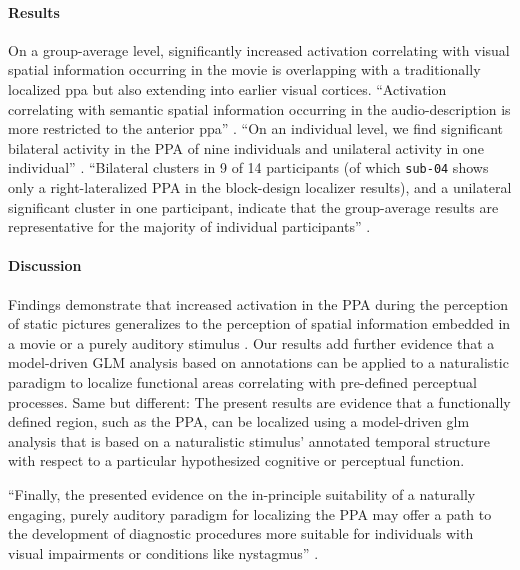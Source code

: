 \paragraph{Results}

On a group-average level, significantly increased activation correlating with
visual spatial information occurring in the movie is overlapping with a
traditionally localized \ac{ppa} but also extending into earlier visual
cortices.
``Activation correlating with semantic spatial information occurring in the
audio-description is more restricted to the anterior \ac{ppa}''
\citep{haeusler2022processing}.
``On an individual level, we find significant bilateral activity in the PPA of
nine individuals and unilateral activity in one individual''
\citep{haeusler2022processing}.
``Bilateral clusters in 9 of 14 participants (of which \texttt{sub-04} shows
only a right-lateralized PPA in the block-design localizer results), and a
unilateral significant cluster in one participant, indicate that the
group-average results are representative for the majority of individual
participants'' \citep{haeusler2022processing}.


\paragraph{Discussion}

Findings demonstrate that increased activation in the PPA during the perception
of static pictures generalizes to the perception of spatial information embedded
in a movie or a purely auditory stimulus \citep{haeusler2022processing}.
Our results add further evidence that a model-driven GLM analysis based on
annotations can be applied to a naturalistic paradigm to localize functional
areas correlating with pre-defined perceptual processes.
%
Same but different: The present results are evidence that a functionally defined
region, such as the PPA, can be localized using a model-driven \ac{glm} analysis
that is based on a naturalistic stimulus' annotated temporal structure with
respect to a particular hypothesized cognitive or perceptual function.

``Finally, the presented evidence on the in-principle suitability of a naturally
engaging, purely auditory paradigm for localizing the PPA may offer a path to
the development of diagnostic procedures more suitable for individuals with
visual impairments or conditions like nystagmus''
\citep{haeusler2022processing}.


